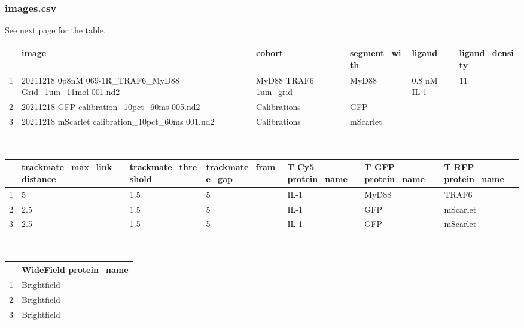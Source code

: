 \subsubsection*{images.csv}
See next page for the table.

\begin{table}
\begin{tabular}{|l|l|l|l|l|l|}
\hline
 & image                                                        & cohort                & segment\_with & ligand      & ligand\_density \\ \hline
1 & 20211218 0p8nM 069-1R\_TRAF6\_MyD88 Grid\_1um\_11mol 001.nd2 & MyD88 TRAF6 1um\_grid & MyD88         & 0.8 nM IL-1 & 11              \\
2 & 20211218 GFP calibration\_10pct\_60ms 005.nd2                & Calibrations          & GFP           &             &                 \\
3 & 20211218 mScarlet calibration\_10pct\_60ms 001.nd2           & Calibrations          & mScarlet      &             &                 \\ \hline
\end{tabular}
\\
\begin{tabular}{|l|l|l|l|l|l|l|}
\hline
 & trackmate\_max\_link\_distance & trackmate\_threshold & trackmate\_frame\_gap & T Cy5 protein\_name & T GFP protein\_name & T RFP protein\_name \\ \hline
1 & 5                              & 1.5                  & 5                     & IL-1                & MyD88               & TRAF6               \\
2 & 2.5                            & 1.5                  & 5                     & IL-1                & GFP                 & mScarlet            \\
3 & 2.5                            & 1.5                  & 5                     & IL-1                & GFP                 & mScarlet            \\ \hline
\end{tabular}
\\
\begin{tabular}{|l|l|}
\hline
 & WideField protein\_name \\ \hline
1 & Brightfield             \\
2 & Brightfield             \\
3 & Brightfield             \\ \hline
\end{tabular}
\end{table}

